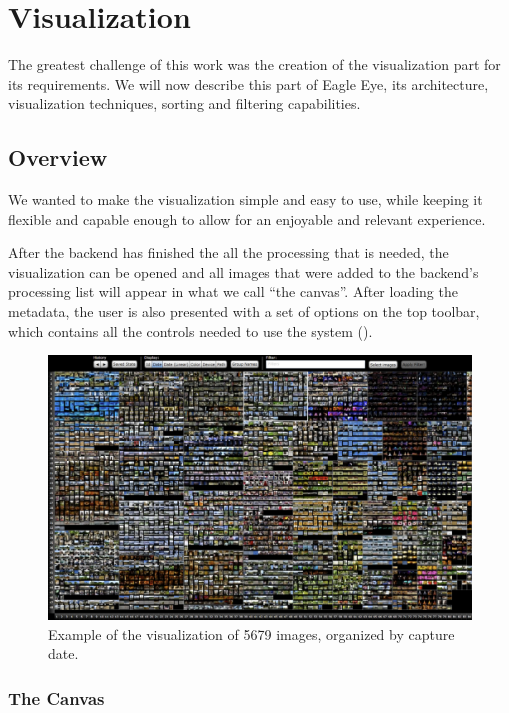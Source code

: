 \section{Visualization} %
\label{sub:visualization}

The greatest challenge of this work was the creation of the visualization part for its requirements. We will now describe this part of Eagle Eye, its architecture, visualization techniques, sorting and filtering capabilities.

\subsection{Overview}
We wanted to make the visualization simple and easy to use, while keeping it flexible and capable enough to allow for an enjoyable and relevant experience.

After the backend has finished the all the processing that is needed, the visualization can be opened and all images that were added to the backend's processing list will appear in what we call ``the canvas''. After loading the metadata, the user is also presented with a set of options on the top toolbar, which contains all the controls needed to use the system ().


\begin{figure}[ht]
	\centering
		\includegraphics[width=\columnwidth]{Figures/viz5679images1280.pdf}
	\caption{Example of the visualization of 5679 images, organized by capture date.}
	\label{fig:viz5679images}
\end{figure}



\subsubsection{The Canvas}

